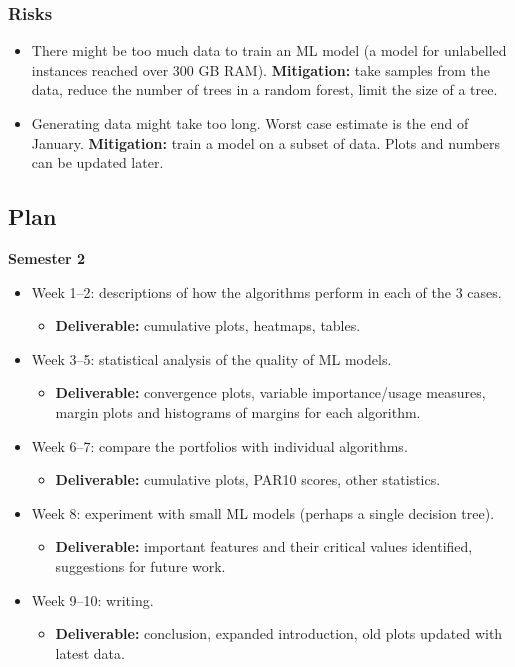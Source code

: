 \documentclass[11pt]{article}
\begin{document}
\subsubsection{Risks}\label{risks}


\begin{itemize}
\item There might be too much data to train an ML model (a model for unlabelled
  instances reached over 300 GB RAM). \textbf{Mitigation:} take samples from the
  data, reduce the number of trees in a random forest, limit the size of a tree.
\item Generating data might take too long. Worst case estimate is the end of
  January. \textbf{Mitigation:} train a model on a subset of data. Plots and
  numbers can be updated later.
\end{itemize}

\subsection{Plan}\label{plan}


\textbf{Semester 2}
\begin{itemize}
\item Week 1--2: descriptions of how the algorithms perform in each of the 3 cases.
  \begin{itemize}
  \item \textbf{Deliverable:} cumulative plots, heatmaps, tables.
  \end{itemize}
\item Week 3--5: statistical analysis of the quality of ML models.
  \begin{itemize}
  \item \textbf{Deliverable:} convergence plots, variable importance/usage
    measures, margin plots and histograms of margins for each algorithm.
  \end{itemize}
\item Week 6--7: compare the portfolios with individual algorithms.
  \begin{itemize}
  \item \textbf{Deliverable:} cumulative plots, PAR10 scores, other statistics.
  \end{itemize}
\item Week 8: experiment with small ML models (perhaps a single decision tree).
  \begin{itemize}
  \item \textbf{Deliverable:} important features and their critical values
    identified, suggestions for future work.
  \end{itemize}
\item Week 9--10: writing.
  \begin{itemize}
  \item \textbf{Deliverable:} conclusion, expanded introduction, old plots
    updated with latest data.
  \end{itemize}
\end{itemize}
\end{document}
